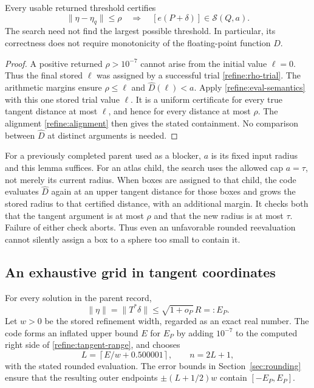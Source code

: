 \begin{lemma}\label{refine:rho-certificate}
Every usable returned threshold certifies
\[
 \|\eta-\eta_q\|\leq\rho
 \quad\Longrightarrow\quad
 [e(P+\delta)]\in\mathcal S(Q,a).
\]
The search need not find the largest possible threshold.  In particular,
its correctness does not require monotonicity of the floating-point
function $\widehat D$.
\end{lemma}

\begin{proof}
A positive returned $\rho>10^{-7}$ cannot arise from the initial value
$\ell=0$.  Thus the final stored $\ell$ was assigned by a successful
trial \eqref{refine:rho-trial}.  The arithmetic margins ensure
$\rho\leq\ell$ and $\widehat D(\ell)<a$.  Apply
\eqref{refine:eval-semantics} with this one stored trial value $\ell$.
It is a uniform certificate for every true tangent distance at most
$\ell$, and hence for every distance at most $\rho$.  The alignment
\eqref{refine:alignment} then gives the stated containment.  No
comparison between $\widehat D$ at distinct arguments is needed.
\end{proof}

For a previously completed parent used as a blocker, $a$ is its fixed
input radius and this lemma suffices.  For an atlas child, the search
uses the allowed cap $a=\tau$, not merely its current radius.  When
boxes are assigned to that child, the code evaluates $\widehat D$
again at an upper tangent distance for those boxes and grows the stored
radius to that certified distance, with an additional margin.  It
checks both that the tangent argument is at most $\rho$ and that the
new radius is at most $\tau$.  Failure of either check aborts.  Thus
even an unfavorable rounded reevaluation cannot silently assign a box
to a sphere too small to contain it.

\subsection{An exhaustive grid in tangent coordinates}

For every solution in the parent record,
\begin{equation}\label{refine:tangent-range}
 \|\eta\|=\|T^*\delta\|
       \leq\sqrt{1+o_P}\,R=:E_P.
\end{equation}
Let $w>0$ be the stored refinement width, regarded as an exact real
number.  The code forms an inflated upper bound $E$ for $E_P$ by adding
$10^{-7}$ to the computed right side of \eqref{refine:tangent-range},
and chooses
\[
 L=\left\lceil E/w+0.500001\right\rceil,
 \qquad n=2L+1,
\]
with the stated rounded evaluation.  The error bounds in
Section~\ref{sec:rounding} ensure that the resulting outer endpoints
$\pm(L+1/2)w$ contain $[-E_P,E_P]$.

